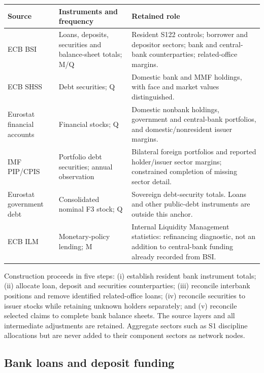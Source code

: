 \begin{table}[H]
\centering
{}
\label{tab:data_source_summary}

\small
\renewcommand{\arraystretch}{1.12}
\begin{tabularx}{\textwidth}{@{}>{\raggedright\arraybackslash}p{2.45cm}>{\raggedright\arraybackslash}p{2.9cm}>{\raggedright\arraybackslash}X@{}}
\toprule
Source & Instruments and frequency & Retained role \\
\midrule
ECB BSI & Loans, deposits, securities and balance-sheet totals; M/Q & Resident S122 controls; borrower and depositor sectors; bank and central-bank counterparties; related-office margins. \\
ECB SHSS & Debt securities; Q & Domestic bank and MMF holdings, with face and market values distinguished. \\
Eurostat financial accounts & Financial stocks; Q & Domestic nonbank holdings, government and central-bank portfolios, and domestic/nonresident issuer margins. \\
IMF PIP/CPIS & Portfolio debt securities; annual observation & Bilateral foreign portfolios and reported holder/issuer sector margins; constrained completion of missing sector detail. \\
Eurostat government debt & Consolidated nominal F3 stock; Q & Sovereign debt-security totals. Loans and other public-debt instruments are outside this anchor. \\
ECB ILM & Monetary-policy lending; M & Internal Liquidity Management statistics: refinancing diagnostic, not an addition to central-bank funding already recorded from BSI. \\
\bottomrule
\end{tabularx}
\end{table}

Construction proceeds in five steps: (i) establish resident bank instrument totals; (ii) allocate loan, deposit and securities counterparties; (iii) reconcile interbank positions and remove identified related-office loans; (iv) reconcile securities to issuer stocks while retaining unknown holders separately; and (v) reconcile selected claims to complete bank balance sheets. The source layers and all intermediate adjustments are retained. Aggregate sectors such as S1 discipline allocations but are never added to their component sectors as network nodes.

\subsection{Bank loans and deposit funding}

